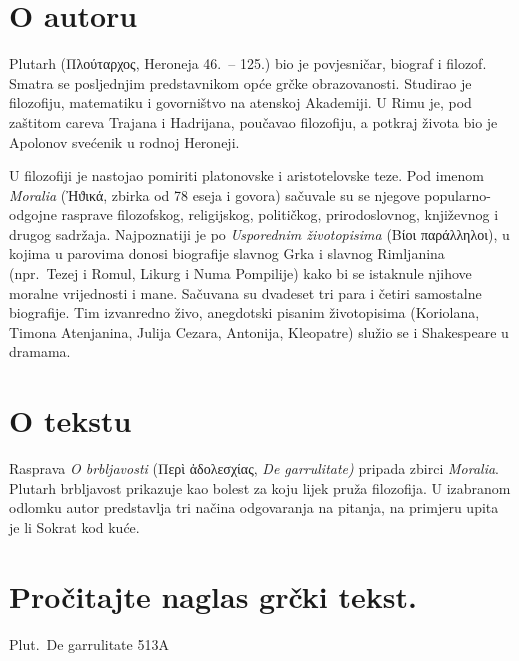 \section*{O autoru}

Plutarh (Πλούταρχος, Heroneja 46.\ – 125.) bio je povjesničar, biograf i filozof. Smatra se posljednjim predstavnikom opće grčke obrazovanosti. Studirao je filozofiju, matematiku i govorništvo na atenskoj Akademiji. U Rimu je, pod zaštitom careva Trajana i Hadrijana, poučavao filozofiju, a potkraj života bio je Apolonov svećenik u rodnoj Heroneji. 

U filozofiji je nastojao pomiriti platonovske i aristotelovske teze. Pod imenom \textit{Moralia} (Ἠϑικά, zbirka od 78 eseja i govora) sačuvale su se njegove popularno-odgojne rasprave filozofskog, religijskog, političkog, prirodoslovnog, književnog i drugog sadržaja. Najpoznatiji je po \textit{Usporednim životopisima} \textgreek[variant=ancient]{(Βίοι παράλληλοι),} u kojima u parovima donosi biografije slavnog Grka i slavnog Rimljanina (npr.\ Tezej i Romul, Likurg i Numa Pompilije) kako bi se istaknule njihove moralne vrijednosti i mane. Sačuvana su dvadeset tri para i četiri samostalne biografije. Tim izvanredno živo, anegdotski pisanim životopisima (Koriolana, Timona Atenjanina, Julija Cezara, Antonija, Kleopatre) služio se i Shakespeare u dramama.

\section*{O tekstu}

Rasprava \textit{O brbljavosti} \textgreek[variant=ancient]{(Περὶ ἀδολεσχίας,} \textit{De garrulitate)} pripada zbirci \textit{Moralia}. Plutarh brbljavost prikazuje kao bolest za koju lijek pruža filozofija. U izabranom odlomku autor predstavlja tri načina odgovaranja na pitanja, na primjeru upita je li Sokrat kod kuće.

\newpage

\section*{Pročitajte naglas grčki tekst.}


Plut.\ De garrulitate 513A

\medskip

